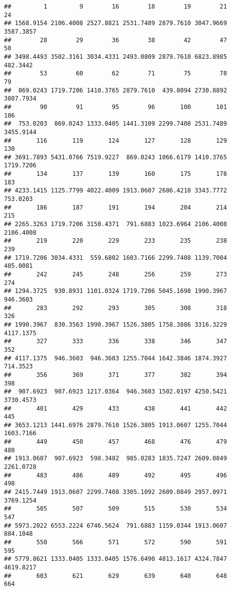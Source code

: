 \documentclass[]{article}
\begin{document}
\begin{verbatim}
##         1         9        16        18        19        21        24 
## 1568.9154 2106.4008 2527.8821 2531.7489 2879.7610 3047.9669 3587.3857 
##        28        29        36        38        42        47        50 
## 3498.4493 3502.3161 3034.4331 2493.0809 2879.7610 6823.8985  482.3442 
##        53        60        62        71        75        78        79 
##  869.0243 1719.7206 1410.3765 2879.7610  439.8094 2730.8892 3807.7934 
##        90        91        95        96       100       101       106 
##  753.0203  869.0243 1333.0405 1441.3109 2299.7408 2531.7489 3455.9144 
##       116       119       124       127       128       129       130 
## 3691.7893 5431.0766 7519.9227  869.0243 1066.6179 1410.3765 1719.7206 
##       134       137       139       160       175       178       183 
## 4233.1415 1125.7799 4022.4009 1913.0607 2686.4210 3343.7772  753.0203 
##       186       187       191       194       204       214       215 
## 2265.3263 1719.7206 3150.4371  791.6883 1023.6964 2106.4008 2106.4008 
##       219       220       229       233       235       238       239 
## 1719.7206 3034.4331  559.6802 1603.7166 2299.7408 1139.7004  405.0081 
##       242       245       248       256       259       273       274 
## 1294.3725  930.8931 1101.0324 1719.7206 5045.1698 1990.3967  946.3603 
##       283       292       293       305       308       318       326 
## 1990.3967  830.3563 1990.3967 1526.3805 1758.3886 3316.3229 4117.1375 
##       327       333       336       338       346       347       352 
## 4117.1375  946.3603  946.3603 1255.7044 1642.3846 1874.3927  714.3523 
##       356       369       371       377       382       394       398 
##  907.6923  907.6923 1217.0364  946.3603 1502.0197 4250.5421 3730.4573 
##       401       429       433       438       441       442       445 
## 3653.1213 1441.6976 2879.7610 1526.3805 1913.0607 1255.7044 1603.7166 
##       449       450       457       468       476       479       480 
## 1913.0607  907.6923  598.3482  985.0283 1835.7247 2609.0849 2261.0728 
##       483       486       489       492       495       496       498 
## 2415.7449 1913.0607 2299.7408 3305.1092 2609.0849 2957.0971 3769.1254 
##       505       507       509       515       530       534       547 
## 5973.2022 6553.2224 6746.5624  791.6883 1159.0344 1913.0607  884.1048 
##       550       566       571       572       590       591       595 
## 5779.8621 1333.0405 1333.0405 1576.6490 4813.1617 4324.7847 4619.8217 
##       603       621       629       639       640       648       664 

\end{verbatim}
\end{document}
